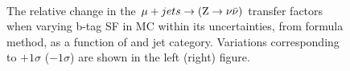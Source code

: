 \begin{figure}[!h]
  \centering
   ~~
  \\

  \caption{\label{fig:tfSyst_bsf_muToZinv-formula} The relative change in the
  $\mu + jets \rightarrow ({\text Z} \rightarrow \nu\bar{\nu})$ transfer
  factors when varying b-tag SF in MC within its uncertainties, from formula method, 
  as a function of \scalht and jet category. 
  Variations corresponding to $+1\sigma$ ($-1\sigma$) are shown in the left (right) figure. 
  }
\end{figure}

